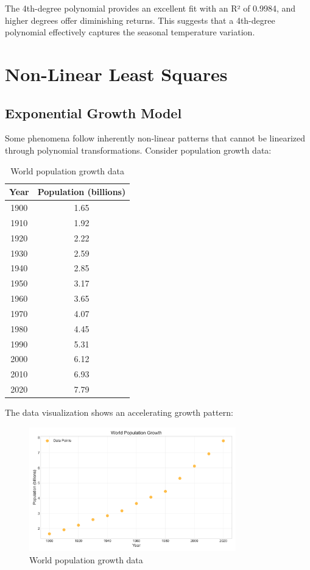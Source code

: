 \documentclass[12pt]{article}
\begin{document}
The 4th-degree polynomial provides an excellent fit with an R² of 0.9984, and higher degrees offer diminishing returns. This suggests that a 4th-degree polynomial effectively captures the seasonal temperature variation.

\section{Non-Linear Least Squares}

\subsection{Exponential Growth Model}

Some phenomena follow inherently non-linear patterns that cannot be linearized through polynomial transformations. Consider population growth data:

\begin{table}[H]
\centering
\begin{tabular}{cc}
\toprule
Year & Population (billions) \\
\midrule
1900 & 1.65 \\
1910 & 1.92 \\
1920 & 2.22 \\
1930 & 2.59 \\
1940 & 2.85 \\
1950 & 3.17 \\
1960 & 3.65 \\
1970 & 4.07 \\
1980 & 4.45 \\
1990 & 5.31 \\
2000 & 6.12 \\
2010 & 6.93 \\
2020 & 7.79 \\
\bottomrule
\end{tabular}
\caption{World population growth data}
\label{tab:population_data}
\end{table}

The data visualization shows an accelerating growth pattern:

\begin{figure}[H]
\centering
\includegraphics[width=0.8\textwidth]{population_data.png}
\caption{World population growth data}
\label{fig:population_data}
\end{figure}
\end{document}
